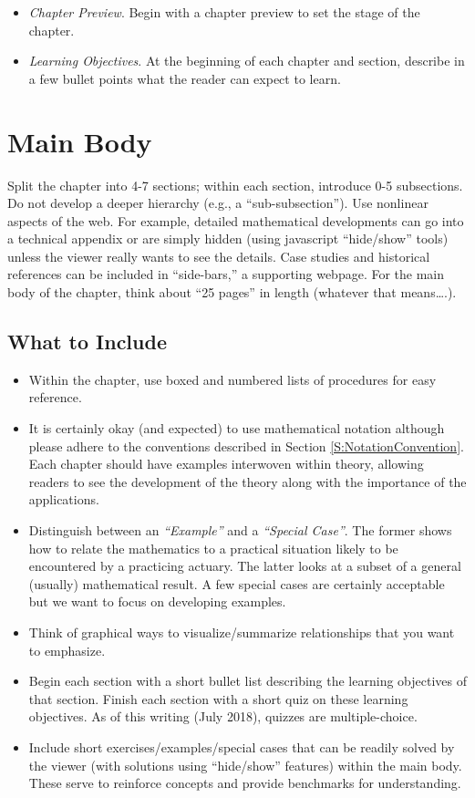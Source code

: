 \documentclass[]{book}
\theoremstyle{definition}
\theoremstyle{definition}
\theoremstyle{definition}
\theoremstyle{remark}
\begin{document}
\begin{itemize}
\item
  \emph{Chapter Preview}. Begin with a chapter preview to set the stage
  of the chapter.
\item
  \emph{Learning Objectives}. At the beginning of each chapter and
  section, describe in a few bullet points what the reader can expect to
  learn.
\end{itemize}

\section{Main Body}\label{main-body}

Split the chapter into 4-7 sections; within each section, introduce 0-5
subsections. Do not develop a deeper hierarchy (e.g., a
``sub-subsection''). Use nonlinear aspects of the web. For example,
detailed mathematical developments can go into a technical appendix or
are simply hidden (using javascript ``hide/show'' tools) unless the
viewer really wants to see the details. Case studies and historical
references can be included in ``side-bars,'' a supporting webpage. For
the main body of the chapter, think about ``25 pages'' in length
(whatever that means\ldots{}.).

\subsection{What to Include}\label{what-to-include}

\begin{itemize}
\item
  Within the chapter, use boxed and numbered lists of procedures for
  easy reference.
\item
  It is certainly okay (and expected) to use mathematical notation
  although please adhere to the conventions described in Section
  \ref{S:NotationConvention}. Each chapter should have examples
  interwoven within theory, allowing readers to see the development of
  the theory along with the importance of the applications.
\item
  Distinguish between an \emph{``Example''} and a \emph{``Special
  Case''}. The former shows how to relate the mathematics to a practical
  situation likely to be encountered by a practicing actuary. The latter
  looks at a subset of a general (usually) mathematical result. A few
  special cases are certainly acceptable but we want to focus on
  developing examples.
\item
  Think of graphical ways to visualize/summarize relationships that you
  want to emphasize.
\item
  Begin each section with a short bullet list describing the learning
  objectives of that section. Finish each section with a short quiz on
  these learning objectives. As of this writing (July 2018), quizzes are
  multiple-choice.
\item
  Include short exercises/examples/special cases that can be readily
  solved by the viewer (with solutions using ``hide/show'' features)
  within the main body. These serve to reinforce concepts and provide
  benchmarks for understanding.
\end{itemize}
\end{document}
